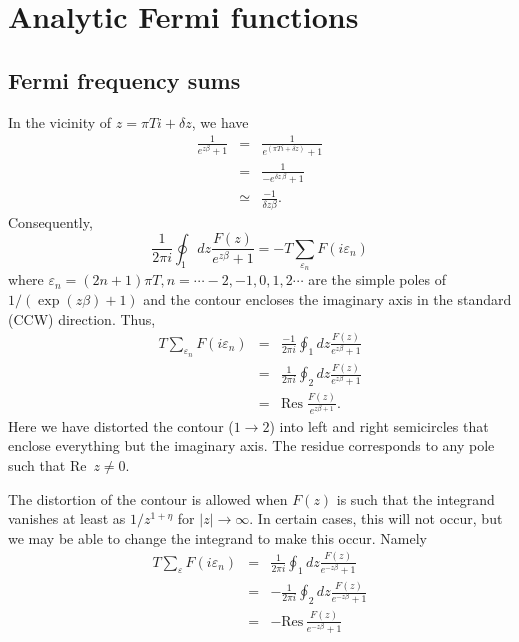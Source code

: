 \chapter{Analytic Fermi functions}
\label{chapter:fermi-functions}

\section{Fermi frequency sums}

In the vicinity of $z = \pi T i + \delta z$, we have
\begin{eqnarray}
\frac{1}{e^{z \beta} + 1} & = & \frac{1}{e^{(\pi T i + \delta z)} + 1} \\
\label{form-one}
& = & \frac{1}{-e^{\delta z\, \beta} + 1} \\
& \simeq & \frac{-1}{\delta z \beta}. 
\end{eqnarray}
Consequently,
\begin{equation}
\frac{1}{2 \pi i} \oint_1 dz \frac{F(z)}{e^{z \beta} + 1}
= -T \sum_{\varepsilon_n} F(i \varepsilon_n)
\end{equation}
where $\varepsilon_n = (2n+1)\pi T, n= \cdots -2,-1,0,1,2 \cdots$
are the simple poles of $1/(\exp(z \beta) + 1)$ and
the contour encloses the imaginary axis in the
standard (CCW) direction.
Thus,
\begin{eqnarray}
T \sum_{\varepsilon_n} F(i \varepsilon_n) & = &
 \frac{-1}{2 \pi i} \oint_1 dz \frac{F(z)}{e^{z \beta}+1} \\
& = & \frac{1}{2 \pi i} \oint_2 dz \frac{F(z)}{e^{z \beta}+1} \\
& = & \mathrm{Res}\; \frac{F(z)}{e^{z \beta + 1}}.
\end{eqnarray}
Here we have distorted the contour 
($1 \to 2$) into left and right semicircles
that enclose everything but the imaginary axis.  
The residue corresponds to any pole such that Re~$z \ne 0$.

The distortion of the contour is allowed when $F(z)$ is such
that the integrand vanishes at least as $1/z^{1 + \eta}$
for $|z| \to \infty$.  In certain cases, this will
not occur, but we may be able to change the integrand
to make this occur.  Namely
\begin{eqnarray}
T \sum_{\varepsilon} F(i \varepsilon_n) & = &
\frac{1}{2 \pi i} \oint_1 dz \frac{F(z)}{e^{-z \beta}+1} \\
\label{form-two}
& = & - \frac{1}{2 \pi i} \oint_2 dz \frac{F(z)}{e^{-z \beta}+1} \\
& = & - \mathrm{Res}\, \frac{F(z)}{e^{-z \beta} + 1}
\end{eqnarray} 

